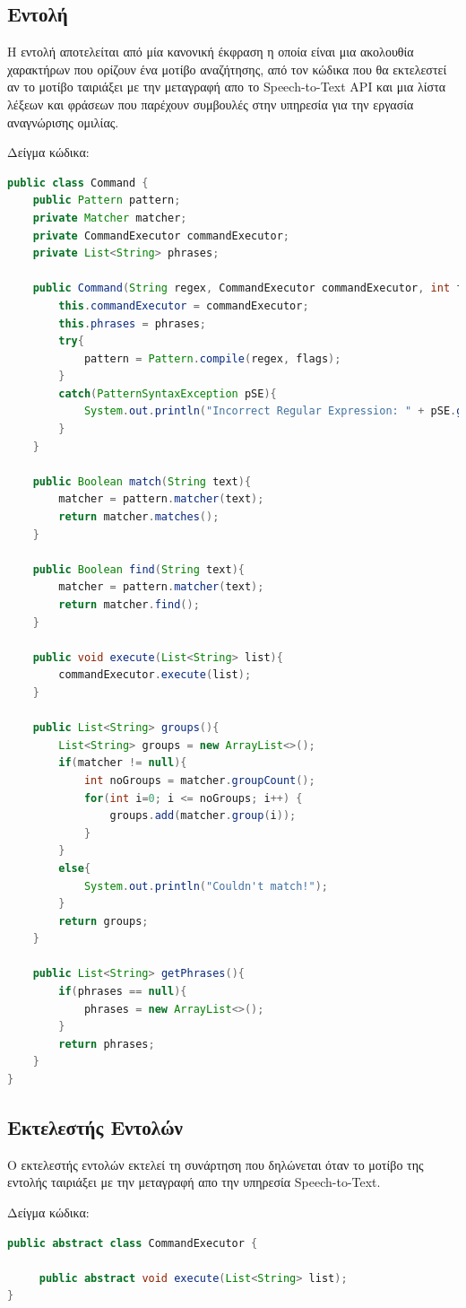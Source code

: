 \documentclass[oneside, 12pt]{book}
\begin{document}
\subsection{Εντολή}
Η εντολή αποτελείται από μία κανονική έκφραση η οποία είναι μια ακολουθία χαρακτήρων που ορίζουν ένα μοτίβο αναζήτησης, από τον κώδικα που θα εκτελεστεί αν το μοτίβο ταιριάξει με την μεταγραφή απο το Speech-to-Text API και μια λίστα λέξεων και φράσεων που παρέχουν συμβουλές στην υπηρεσία για την εργασία αναγνώρισης ομιλίας.
\begin{center}
	Δείγμα κώδικα:
	\begin{lstlisting}[language=java]
public class Command {
    public Pattern pattern;
    private Matcher matcher;
    private CommandExecutor commandExecutor;
    private List<String> phrases;

    public Command(String regex, CommandExecutor commandExecutor, int flags, List<String> phrases){
        this.commandExecutor = commandExecutor;
        this.phrases = phrases;
        try{
            pattern = Pattern.compile(regex, flags);
        }
        catch(PatternSyntaxException pSE){
            System.out.println("Incorrect Regular Expression: " + pSE.getMessage());
        }
    }

    public Boolean match(String text){
        matcher = pattern.matcher(text);
        return matcher.matches();
    }

    public Boolean find(String text){
        matcher = pattern.matcher(text);
        return matcher.find();
    }

    public void execute(List<String> list){
        commandExecutor.execute(list);
    }

    public List<String> groups(){
        List<String> groups = new ArrayList<>();
        if(matcher != null){
            int noGroups = matcher.groupCount();
            for(int i=0; i <= noGroups; i++) {
                groups.add(matcher.group(i));
            }
        }
        else{
            System.out.println("Couldn't match!");
        }
        return groups;
    }

    public List<String> getPhrases(){
        if(phrases == null){
            phrases = new ArrayList<>();
        }
        return phrases;
    }
}
	\end{lstlisting}
\end{center}
\subsection{Εκτελεστής Εντολών}
Ο εκτελεστής εντολών εκτελεί τη συνάρτηση που δηλώνεται όταν το μοτίβο της εντολής ταιριάξει με την μεταγραφή απο την υπηρεσία Speech-to-Text.
\begin{center}
	Δείγμα κώδικα:
	\begin{lstlisting}[language=java]
public abstract class CommandExecutor {

     public abstract void execute(List<String> list);
}
	\end{lstlisting}
\end{center}
\end{document}
